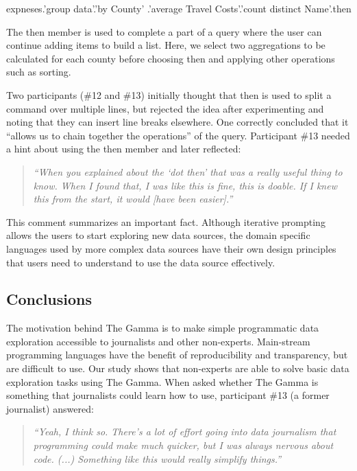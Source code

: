 \documentclass{sigchi}
\newcommand{\ikvd}[1]{{\fontfamily{zi4}\selectfont\small #1}}
\begin{document}
\begin{thegamma}
expneses.'group data'.'by County'
  .'average Travel Costs'.'count distinct Name'.then
\end{thegamma}

The \ikvd{then} member is used to complete a part of a query where the user can continue
adding items to build a list. Here, we select two aggregations to be calculated for each
county before choosing \ikvd{then} and applying other operations such as sorting.

Two participants (\#12 and \#13) initially thought that \ikvd{then} is used to split a command
over multiple lines, but rejected the idea after experimenting and noting that they can insert
line breaks elsewhere. One correctly concluded that it ``allows us to chain together the
operations'' of the query. Participant \#13 needed a hint about using the
\ikvd{then} member and later reflected:

\begin{quote}
  \emph{``When you explained about the `dot then' that was a really useful thing to know.
  When I found that, I was like this is fine, this is doable. If I knew this from the start,
  it would [have been easier].''}
\end{quote}

This comment summarizes an important fact. Although iterative prompting allows the users to start
exploring new data sources, the domain specific languages used by more complex data sources have
their own design principles that users need to understand to use the data source effectively.

\subsection{Conclusions}
The motivation behind The Gamma is to make simple programmatic data exploration accessible to
journalists and other non-experts. Main-stream programming languages have the benefit of
reproducibility and transparency, but are difficult to use. Our study shows that non-experts
are able to solve basic data exploration tasks using The Gamma. When asked whether The Gamma
is something that journalists could learn how to use, participant \#13 (a former journalist) answered:

\begin{quote}
\emph{``Yeah, I think so. There's a lot of effort going into data journalism that
  programming could make much quicker, but I was always nervous about code. (...)
  Something like this would really simplify things.''}
\end{quote}
\end{document}
